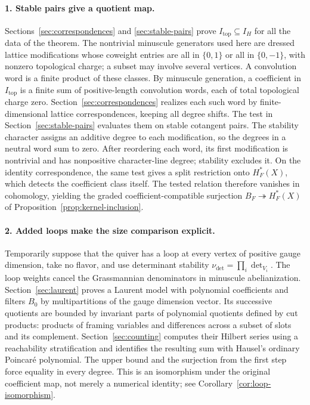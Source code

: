 \paragraph{1. Stable pairs give a quotient map.}
Sections~\ref{sec:correspondences} and \ref{sec:stable-pairs} prove
$I_{\mathrm{top}}\subseteq I_H$ for all the data of the theorem.
The nontrivial minuscule generators used here are dressed lattice
modifications whose coweight entries are all in $\{0,1\}$ or all in
$\{0,-1\}$, with nonzero topological charge; a subset may involve several
vertices.  A convolution word is a finite product of these classes.
By minuscule generation, a coefficient in $I_{\mathrm{top}}$ is a finite
sum of positive-length convolution words, each of total topological charge zero.
Section~\ref{sec:correspondences} realizes each such word by
finite-dimensional lattice correspondences, keeping all degree shifts.
The test in Section~\ref{sec:stable-pairs} evaluates them on stable
cotangent pairs.  The stability character assigns an additive degree to
each modification, so the degrees in a neutral word sum to zero.
After reordering each word, its first modification is nontrivial and has
nonpositive character-line degree; stability excludes it.  On the identity
correspondence, the same test gives a split restriction onto $H_F^*(X)$,
which detects the coefficient class itself.  The tested relation therefore vanishes
in cohomology, yielding the graded coefficient-compatible surjection
$B_F\twoheadrightarrow H_F^*(X)$ of
Proposition~\ref{prop:kernel-inclusion}.

\paragraph{2. Added loops make the size comparison explicit.}
Temporarily suppose that the quiver has a loop at every vertex of
positive gauge dimension, take no flavor, and use determinant stability
$\nu_{\det}=\prod_i\det_{V_i}$.
The loop weights cancel the Grassmannian denominators in minuscule
abelianization.  Section~\ref{sec:laurent} proves a Laurent model with
polynomial coefficients and filters $B_0$ by multipartitions
of the gauge dimension vector.  Its successive quotients are bounded by
invariant parts of polynomial quotients defined by cut products: products of framing variables
and differences across a subset of slots and its complement.
Section~\ref{sec:counting} computes their Hilbert series
using a reachability stratification and identifies the resulting sum
with Hausel's ordinary Poincar\'e polynomial.  The upper bound and the
surjection from the first step force equality in every degree.  This is
an isomorphism under the original coefficient map, not merely a numerical
identity; see Corollary~\ref{cor:loop-isomorphism}.

